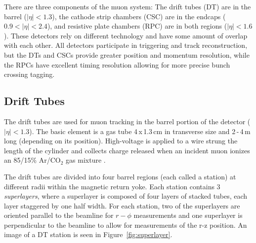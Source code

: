 There are three components of the muon system: The drift tubes (DT) are in the barrel ($|\eta|<1.3$), the cathode strip chambers (CSC) are in the endcaps ($0.9<|\eta|<2.4$), and resistive plate chambers (RPC) are in both regions ($|\eta| < 1.6$). These detectors rely on different technology and have some amount of overlap with each other. All detectors participate in triggering and track reconstruction, but the DTs and CSCs provide greater position and momentum resolution, while the RPCs have excellent timing resolution allowing for more precise bunch crossing tagging.

\subsection{Drift Tubes}

The drift tubes are used for muon tracking in the barrel portion of the detector ($|\eta|<1.3$). The basic element is a gas tube 4$\,$x$\,$1.3$\,$cm in transverse size and 2$\,$-$\,$4$\,$m long (depending on its position). High-voltage is applied to a wire strung the length of the cylinder and collects charge released when an incident muon ionizes an 85/15\% Ar/CO$_{2}$ gas mixture \cite{dtperformance}.

The drift tubes are divided into four barrel regions (each called a station) at different radii within the magnetic return yoke. Each station contains 3 \textit{superlayers}, where a superlayer is composed of four layers of stacked tubes, each layer staggered by one half width. For each station, two of the superlayers are oriented parallel to the beamline for $r-\phi$ measurements and one superlayer is perpendicular to the beamline to allow for measurements of the r-z position. An image of a DT station is seen in Figure~\ref{fig:superlayer}.

